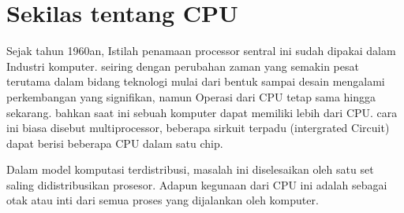 \section{Sekilas tentang CPU}
	Sejak tahun 1960an, Istilah penamaan processor sentral ini sudah dipakai dalam Industri komputer. seiring dengan perubahan zaman yang semakin pesat terutama dalam bidang teknologi mulai dari bentuk sampai desain mengalami perkembangan yang signifikan, namun Operasi dari CPU tetap sama hingga sekarang. bahkan saat ini sebuah komputer dapat memiliki lebih dari CPU. cara ini biasa disebut multiprocessor, beberapa sirkuit terpadu (intergrated Circuit) dapat berisi beberapa CPU dalam satu chip.

	Dalam model komputasi terdistribusi, masalah ini diselesaikan oleh satu set saling didistribusikan prosesor. Adapun kegunaan dari CPU ini adalah sebagai otak atau inti dari semua proses yang dijalankan oleh komputer.
